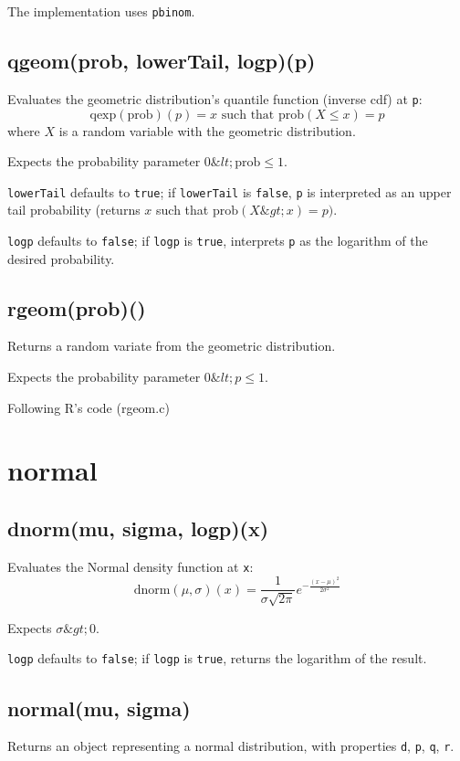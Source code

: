 \documentclass{article}
\begin{document}
The implementation uses \texttt{pbinom}.


    \subsection*{qgeom(prob, lowerTail, logp)(p)}
    Evaluates the geometric distribution's quantile function
(inverse cdf) at \texttt{p}:
$$\textrm{qexp}(\textrm{prob})(p) = x \textrm{ such that } \textrm{prob}(X \leq x) = p$$
where $X$ is a random variable with the geometric distribution.


Expects the probability parameter $0 \&lt; \textrm{prob} \leq 1$.


\texttt{lowerTail} defaults to \texttt{true}; if \texttt{lowerTail} is \texttt{false}, \texttt{p} is
interpreted as an upper tail probability (returns
$x$ such that $\textrm{prob}(X \&gt; x) = p)$.


\texttt{logp} defaults to \texttt{false}; if \texttt{logp} is \texttt{true}, interprets \texttt{p} as
the logarithm of the desired probability.


    \subsection*{rgeom(prob)()}
    Returns a random variate from the geometric distribution.


Expects the probability parameter $0 \&lt; p \leq 1$.


Following R's code (rgeom.c)


  \section{normal}
    \subsection*{dnorm(mu, sigma, logp)(x)}
    Evaluates the Normal density function at \texttt{x}:
$$\textrm{dnorm}(\mu, \sigma)(x) = \frac{1}{\sigma \sqrt{2\pi}} e^{\displaystyle -\frac{(x-\mu)^2}{2\sigma^2}}$$


Expects $\sigma \&gt; 0$.


\texttt{logp} defaults to \texttt{false}; if \texttt{logp} is \texttt{true}, returns the
logarithm of the result.


    \subsection*{normal(mu, sigma)}
    Returns an object representing a normal distribution, with properties \texttt{d}, \texttt{p}, \texttt{q}, \texttt{r}.
\end{document}
